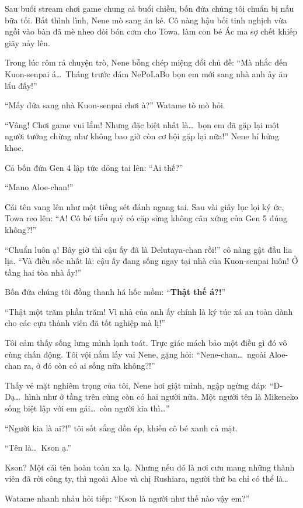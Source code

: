 \documentclass[../main.tex]{subfiles}
\begin{document}
Sau buổi stream chơi game chung cả buổi chiều, bốn đứa chúng tôi chuẩn bị nấu bữa tối. Bất thình lình, Nene mò sang ăn ké. Cô nàng hậu bối tinh nghịch vừa ngồi vào bàn đã mè nheo đòi bón cơm cho Towa, làm con bé Ác ma sợ chết khiếp giãy nảy lên.

Trong lúc rôm rả chuyện trò, Nene bỗng chép miệng đổi chủ đề: ``Mà nhắc đến Kuon-senpai á\dots\ Tháng trước đám NePoLaBo bọn em mới sang nhà anh ấy ăn lẩu đấy!''

``Mấy đứa sang nhà Kuon-senpai chơi à?'' Watame tò mò hỏi.

``Vâng! Chơi game vui lắm! Nhưng đặc biệt nhất là\dots\ bọn em đã gặp lại một người tưởng chừng như không bao giờ còn cơ hội gặp lại nữa!'' Nene hí hửng khoe.

Cả bốn đứa Gen 4 lập tức dỏng tai lên: ``Ai thế?''

``Mano Aloe-chan!''

Cái tên vang lên như một tiếng sét đánh ngang tai. Sau vài giây lục lọi ký ức, Towa reo lên: ``A! Cô bé tiểu quỷ có cặp sừng không cân xứng của Gen 5 đúng không?!''

``Chuẩn luôn ạ! Bây giờ thì cậu ấy đã là Delutaya-chan rồi!'' cô nàng gật đầu lia lịa. ``Và điều sốc nhất là: cậu ấy đang sống ngay tại nhà của Kuon-senpai luôn! Ở tầng hai tòa nhà ấy!''

Bốn đứa chúng tôi đồng thanh há hốc mồm: ``\textbf{Thật thế á?!}''

``Thật một trăm phần trăm! Vì nhà của anh ấy chính là ký túc xá an toàn dành cho các cựu thành viên đã tốt nghiệp mà lị!''

Tôi cảm thấy sống lưng mình lạnh toát. Trực giác mách bảo một điều gì đó vô cùng chấn động. Tôi vội nắm lấy vai Nene, gặng hỏi: ``Nene-chan\dots\ ngoài Aloe-chan ra, ở đó còn có ai sống nữa không?!''

Thấy vẻ mặt nghiêm trọng của tôi, Nene hơi giật mình, ngập ngừng đáp: ``D-Dạ\dots\ hình như ở tầng trên cùng còn có hai người nữa. Một người tên là Mikeneko sống biệt lập với em gái\dots\ còn người kia thì\dots''

``Người kia là ai?!'' tôi sốt sắng dồn ép, khiến cô bé xanh cả mặt.

``Tên là\dots\ Kson ạ.''

Kson? Một cái tên hoàn toàn xa lạ. Nhưng nếu đó là nơi cưu mang những thành viên đã rời công ty, thì ngoài Aloe và chị Rushiara, người thứ ba chỉ có thể là\dots

Watame nhanh nhảu hỏi tiếp: ``Kson là người như thế nào vậy em?''
\end{document}
